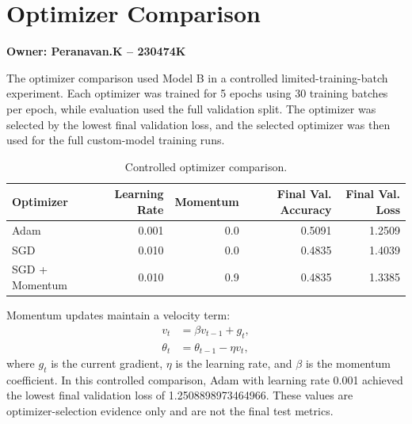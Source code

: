 \section{Optimizer Comparison}
\textbf{Owner: Peranavan.K -- 230474K}

The optimizer comparison used Model B in a controlled limited-training-batch experiment. Each optimizer was trained for 5 epochs using 30 training batches per epoch, while evaluation used the full validation split. The optimizer was selected by the lowest final validation loss, and the selected optimizer was then used for the full custom-model training runs.

\begin{table}[H]
\centering
\caption{Controlled optimizer comparison.}
\label{tab:optimizer}
\begin{tabular}{lrrrr}
\toprule
Optimizer & Learning Rate & Momentum & Final Val. Accuracy & Final Val. Loss \\
\midrule
Adam & 0.001 & 0.0 & 0.5091 & 1.2509 \\
SGD & 0.010 & 0.0 & 0.4835 & 1.4039 \\
SGD + Momentum & 0.010 & 0.9 & 0.4835 & 1.3385 \\
\bottomrule
\end{tabular}
\end{table}

Momentum updates maintain a velocity term:
\begin{align}
v_t &= \beta v_{t-1} + g_t,\\
\theta_t &= \theta_{t-1} - \eta v_t,
\end{align}
where $g_t$ is the current gradient, $\eta$ is the learning rate, and $\beta$ is the momentum coefficient. In this controlled comparison, Adam with learning rate 0.001 achieved the lowest final validation loss of 1.2508898973464966. These values are optimizer-selection evidence only and are not the final test metrics.
